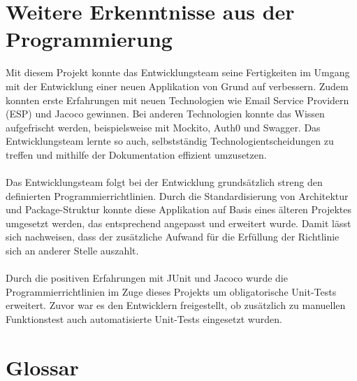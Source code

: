 \documentclass[
]{article}
\begin{document}
\section{Weitere Erkenntnisse aus der Programmierung}
Mit diesem Projekt konnte das Entwicklungsteam seine Fertigkeiten im Umgang mit der Entwicklung einer neuen Applikation von Grund auf verbessern. Zudem konnten erste Erfahrungen mit neuen Technologien wie Email Service Providern (ESP) und Jacoco gewinnen. Bei anderen Technologien konnte das Wissen aufgefrischt werden, beispielsweise mit Mockito, Auth0 und Swagger. Das Entwicklungsteam lernte so auch, selbstständig Technologientscheidungen zu treffen und mithilfe der Dokumentation effizient umzusetzen.  \\ \\
Das Entwicklungsteam folgt bei der Entwicklung grundsätzlich streng den definierten Programmierrichtlinien. Durch die Standardisierung von Architektur und Package-Struktur konnte diese Applikation auf Basis eines älteren Projektes umgesetzt werden, das entsprechend angepasst und erweitert wurde. Damit lässt sich nachweisen, dass der zusätzliche Aufwand für die Erfüllung der Richtlinie sich an anderer Stelle auszahlt. \\ \\
Durch die positiven Erfahrungen mit JUnit und Jacoco wurde die Programmierrichtlinien im Zuge dieses Projekts um obligatorische Unit-Tests erweitert. Zuvor war es den Entwicklern freigestellt, ob  zusätzlich zu manuellen Funktionstest auch automatisierte Unit-Tests eingesetzt wurden.


\hypertarget{section-glossary}{%
\section{Glossar}\label{section-glossary}}
\end{document}
